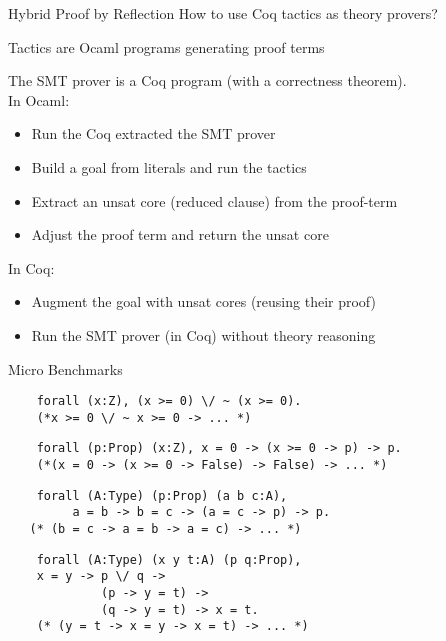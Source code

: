 \documentclass{beamer}
\begin{document}
\begin{frame}{Hybrid Proof by Reflection}
  How to use Coq tactics as theory provers?\\
  \medskip
  
  Tactics are Ocaml programs generating proof terms\\
  \medskip

  The SMT prover is a Coq program (with a correctness theorem).\\

  \medskip
  In Ocaml:
  \begin{itemize}
  \item Run the Coq extracted the SMT prover
  \item Build a goal from literals and run the tactics
  \item Extract an unsat core (reduced clause) from the proof-term
  \item Adjust the proof term and return the unsat core
  \end{itemize}

  In Coq:
  \begin{itemize}
  \item Augment the goal with unsat cores (reusing their proof)
  \item Run the SMT prover (in Coq) without theory reasoning
  \end{itemize}
  
\end{frame}

\begin{frame}[fragile]{Micro Benchmarks}
  \begin{verbatim}
    forall (x:Z), (x >= 0) \/ ~ (x >= 0).
    (*x >= 0 \/ ~ x >= 0 -> ... *)
  \end{verbatim}
  \bigskip

  \begin{verbatim}
    forall (p:Prop) (x:Z), x = 0 -> (x >= 0 -> p) -> p.
    (*(x = 0 -> (x >= 0 -> False) -> False) -> ... *)
  \end{verbatim}
  \bigskip
  
  \begin{verbatim}
    forall (A:Type) (p:Prop) (a b c:A),
         a = b -> b = c -> (a = c -> p) -> p.
   (* (b = c -> a = b -> a = c) -> ... *)
 \end{verbatim}
  \bigskip
  
  \begin{verbatim}
    forall (A:Type) (x y t:A) (p q:Prop),
    x = y -> p \/ q ->
             (p -> y = t) ->
             (q -> y = t) -> x = t.
    (* (y = t -> x = y -> x = t) -> ... *)
  \end{verbatim}

\end{frame}
\end{document}
